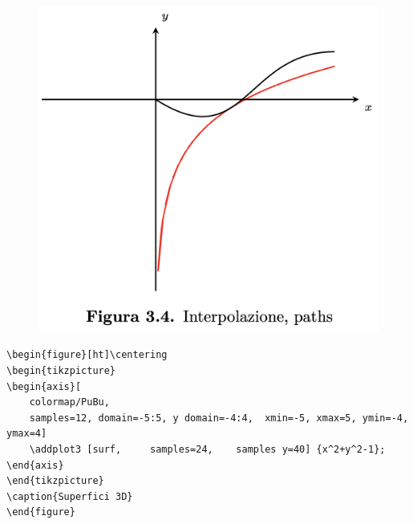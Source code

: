 \begin{figure}[ht]\centering
\includegraphics[scale=.5]{FileAusiliari/Screenshots/Figura3-4.png}
\end{figure}

\newpage

\begin{verbatim}
\begin{figure}[ht]\centering
\begin{tikzpicture}
\begin{axis}[
    colormap/PuBu,
    samples=12, domain=-5:5, y domain=-4:4,  xmin=-5, xmax=5, ymin=-4, ymax=4]
    \addplot3 [surf,     samples=24,    samples y=40] {x^2+y^2-1};
\end{axis}
\end{tikzpicture}	
\caption{Superfici 3D}
\end{figure}
\end{verbatim}

